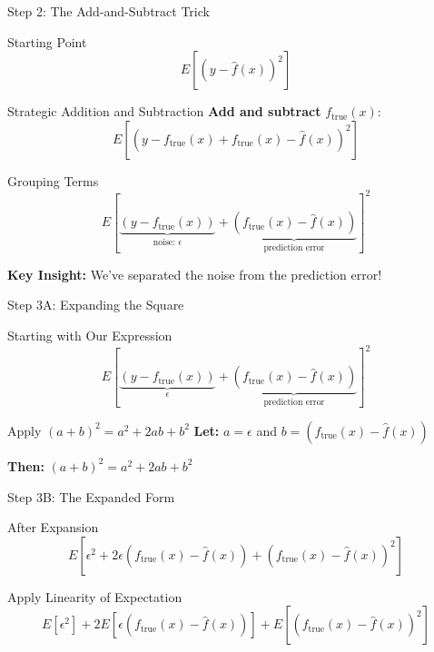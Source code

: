 \documentclass[10pt]{beamer}
\begin{document}
\begin{frame}{Step 2: The Add-and-Subtract Trick}
\begin{keypointsbox}{Starting Point}
$$E[(y - \hat{f}(x))^2]$$
\end{keypointsbox}

\begin{examplebox}{Strategic Addition and Subtraction}
\textbf{Add and subtract } $f_{\text{true}}(x)$:
$$E[(y - f_{\text{true}}(x) + f_{\text{true}}(x) - \hat{f}(x))^2]$$
\end{examplebox}

\begin{definitionbox}{Grouping Terms}
$$E[\underbrace{(y - f_{\text{true}}(x))}_{\text{noise: } \epsilon} + \underbrace{(f_{\text{true}}(x) - \hat{f}(x))}_{\text{prediction error}}]^2$$
\end{definitionbox}

\begin{alertbox}
\textbf{Key Insight:} We've separated the noise from the prediction error!
\end{alertbox}
\end{frame}

\begin{frame}{Step 3A: Expanding the Square}
\begin{keypointsbox}{Starting with Our Expression}
$$E[\underbrace{(y - f_{\text{true}}(x))}_{\epsilon} + \underbrace{(f_{\text{true}}(x) - \hat{f}(x))}_{\text{prediction error}}]^2$$
\end{keypointsbox}

\begin{examplebox}{Apply $(a + b)^2 = a^2 + 2ab + b^2$}
\textbf{Let:} $a = \epsilon$ and $b = (f_{\text{true}}(x) - \hat{f}(x))$

\textbf{Then:} $(a + b)^2 = a^2 + 2ab + b^2$
\end{examplebox}
\end{frame}

\begin{frame}{Step 3B: The Expanded Form}
\begin{definitionbox}{After Expansion}
$$E[\epsilon^2 + 2\epsilon(f_{\text{true}}(x) - \hat{f}(x)) + (f_{\text{true}}(x) - \hat{f}(x))^2]$$
\end{definitionbox}

\begin{keypointsbox}{Apply Linearity of Expectation}
$$E[\epsilon^2] + 2E[\epsilon(f_{\text{true}}(x) - \hat{f}(x))] + E[(f_{\text{true}}(x) - \hat{f}(x))^2]$$
\end{keypointsbox}
\end{frame}
\end{document}

